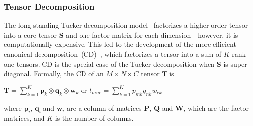 \subsubsection{Tensor Decomposition}
The long-standing Tucker decomposition model~\cite{tucker1963implications} factorizes a 
higher-order tensor into a core tensor $\mathbf{S}$ and one factor matrix for each 
dimension---however, it is computationally expensive.
This led to the development of the more efficient canonical decomposition~(CD)~\cite{carroll1970analysis}, which factorizes a tensor into a sum of $K$ rank-one tensors.
CD is the special case of the Tucker decomposition when $\mathbf{S}$ is super-diagonal.
Formally, the CD of an $M \times N \times C$ tensor $\mathbf{T}$ is
\begin{center}
{\small
$\mathbf{T}=\sum\limits_{k=1}^{K}\mathbf{p}_k\otimes \mathbf{q}_k\otimes \mathbf{w}_k$
}
or
{\small
$t_{mnc}=\sum\limits_{k=1}^{K}p_{mk} q_{nk} w_{ck}$
}
\end{center}
where $\mathbf{p}_i$, $\mathbf{q}_i$ and $\mathbf{w}_i$ are a column of matrices $\mathbf{P}$, $\mathbf{Q}$ and $\mathbf{W}$, which are the factor matrices, and $K$ is the number of columns. 


